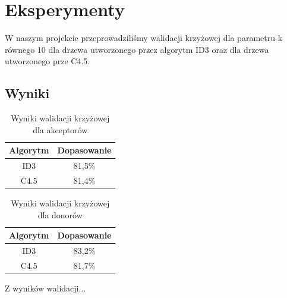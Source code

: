 \section{Eksperymenty}
W naszym projekcie przeprowadziliśmy walidacji krzyżowej dla parametru k równego 10 dla drzewa utworzonego przez algorytm ID3 oraz dla drzewa utworzonego prze C4.5.

\subsection{Wyniki}



\begin{table}[H]
    \centering
    \begin{tabular}{|c|c|}
    \hline
    Algorytm                & Dopasowanie         \\ \hline
    ID3                     & 81,5\%              \\ \hline
    C4.5                    & 81,4\%              \\ \hline
    \end{tabular}
    \caption{Wyniki walidacji krzyżowej dla akceptorów}
    \label{tab:crossing}
\end{table}

\begin{table}[H]
    \centering
    \begin{tabular}{|c|c|}
    \hline
    Algorytm                & Dopasowanie         \\ \hline
    ID3                     & 83,2\%              \\ \hline
    C4.5                    & 81,7\%              \\ \hline
    \end{tabular}
    \caption{Wyniki walidacji krzyżowej dla donorów}
    \label{tab:crossing}
\end{table}

Z wyników walidacji...

